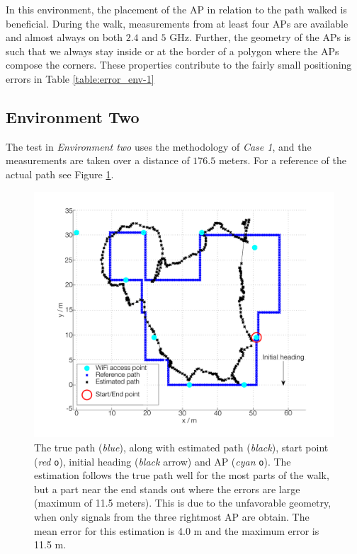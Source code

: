 \documentclass{LTHthesis}
\begin{document}
In this environment, the placement of the AP in relation to the path walked is beneficial. During the walk, measurements from at least four APs are available and almost always on both $2.4$ and $5$ GHz.  Further, the geometry of the APs is such that we always stay inside or at the border of a polygon where the APs compose the corners. These properties contribute to the fairly small positioning errors in Table \ref{table:error_env-1}  
%
\subsection{Environment Two}
%
The test in \emph{Environment two} uses the methodology of \emph{Case 1}, and the measurements are taken over a distance of $176.5$ meters. For a reference of the actual path see Figure \ref{true_vs_est_env_2_05}.    
%
\begin{figure}[!hbt]

\includegraphics[width=1\textwidth ]{images/pure_rssi/true_vs_est_env_2_05}
\caption{The true path (\emph{blue}), along with estimated path (\emph{black}), start point (\emph{red} \texttt{o}), initial heading (\emph{black} arrow) and AP (\emph{cyan} \texttt{o}). The estimation follows the true path well for the most parts of the walk, but a part near the end stands out where the errors are large (maximum of 11.5 meters). This is due to the unfavorable geometry, when only signals from the three rightmost AP are obtain. The mean error for this estimation is 4.0 m and the maximum error is 11.5 m.}\label{true_vs_est_env_2_05}
\end{figure}
\end{document}
